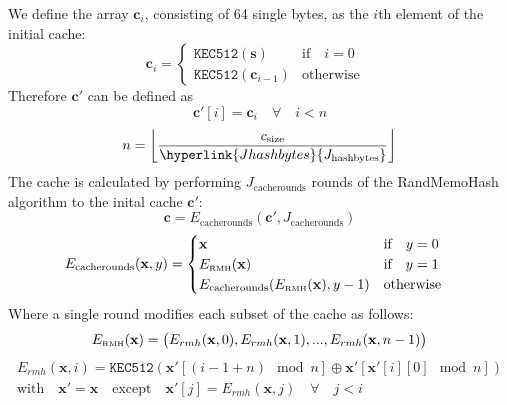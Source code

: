 \documentclass[9pt,oneside]{amsart}
\begin{document}
We define the array $\mathbf{c}_{i}$, consisting of 64 single bytes,  as the $i$th element of the initial cache:
\begin{equation}
 \mathbf{c}_{i} = \begin{cases}
\texttt{KEC512}(\mathbf{s}) & \text{if} \quad i = 0 \quad  \\
\texttt{KEC512}(\mathbf{c}_{i-1}) & \text{otherwise}
\end{cases}
\end{equation}
Therefore $ \mathbf{c'}$ can be defined as
\begin{equation}
 \mathbf{c'}[i] = \mathbf{c}_{i} \quad \forall \quad i < n
\end{equation}
\begin{equation}
 n = \left\lfloor\frac{c_{\mathrm{size}}}{\hyperlink{Jhashbytes}{J_{\mathrm{hashbytes}}}}\right\rfloor
\end{equation}
The cache is calculated by performing \hyperlink{Jcacherounds}{$J_{\mathrm{cacherounds}}$} rounds of the RandMemoHash algorithm to the inital cache $\mathbf{c'}$:
\begin{equation}
 \mathbf{c} = E_{\mathrm{cacherounds}}(\mathbf{c'}, J_{\mathrm{cacherounds}})
\end{equation}
\begin{equation}
 E_{\mathrm{cacherounds}}(\mathbf{x}, y) = \begin{cases}
\mathbf{x} & \text{if} \quad y = 0 \quad  \\
E_\text{\tiny RMH}(\mathbf{x}) & \text{if} \quad y = 1 \quad  \\
E_{\mathrm{cacherounds}}(E_\text{\tiny RMH}(\mathbf{x}), y -1 ) & \text{otherwise}
\end{cases}
\end{equation}
Where a single round modifies each subset of the cache as follows:
\begin{equation}
 E_\text{\tiny RMH}(\mathbf{x}) = \big( E_{rmh}(\mathbf{x}, 0), E_{rmh}(\mathbf{x}, 1), ... , E_{rmh}(\mathbf{x}, n - 1) \big)
\end{equation}
\hypertarget{Ecacherounds}{}
\begin{multline}
  E_{rmh}(\mathbf{x}, i) = \texttt{KEC512}(\mathbf{x'}[(i - 1 + n) \mod n] \oplus \mathbf{x'}[\mathbf{x'}[i][0] \mod n]) \\
  \text{with} \quad \mathbf{x'} = \mathbf{x} \quad \text{except} \quad \mathbf{x'}[j] = E_{rmh}(\mathbf{x}, j) \quad \forall \quad j < i
\end{multline}
\end{document}
